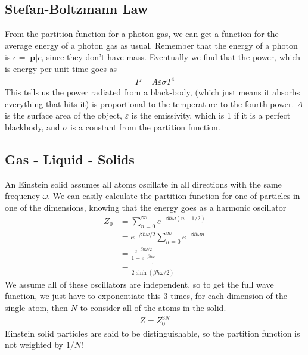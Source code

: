 \subsection{Stefan-Boltzmann Law}
From the partition function for a photon gas, we can get a function for the average energy of a photon gas as usual. Remember that the energy of a photon is $\epsilon = |\textbf{p}|c$, since they don't have mass. Eventually we find that the power, which is energy per unit time goes as 
\begin{align}
    P = A\varepsilon \sigma T^4
\end{align}
This tells us the power radiated from a black-body, (which just means it absorbs everything that hits it) is proportional to the temperature to the fourth power. $A$ is the surface area of the object, $\varepsilon$ is the emissivity, which is 1 if it is a perfect blackbody, and $\sigma$ is a constant from the partition function.

\subsection{Gas - Liquid - Solids}
An Einstein solid assumes all atoms oscillate in all directions with the same frequency $\omega$. We can easily calculate the partition function for one of particles in one of the dimensions, knowing that the energy goes as a harmonic oscillator
\begin{align}
    Z_0 &= \sum_{n=0}^\infty e^{-\beta\hbar\omega(n+1/2)}\\
    &= e^{-\beta\hbar\omega/2} \sum_{n=0}^\infty e^{-\beta\hbar\omega n}\\
    &= \frac{e^{-\beta\hbar\omega/2}}{1-e^{-\beta\hbar\omega}}\\
    &= \frac{1}{2\sinh(\beta\hbar\omega/2)}
\end{align}
We assume all of these oscillators are independent, so to get the full wave function, we just have to exponentiate this 3 times, for each dimension of the single atom, then $N$ to consider all of the atoms in the solid.
\begin{align}
    Z = Z_0^{3N}
\end{align}
Einstein solid particles are said to be distinguishable, so the partition function is not weighted by $1/N!$

